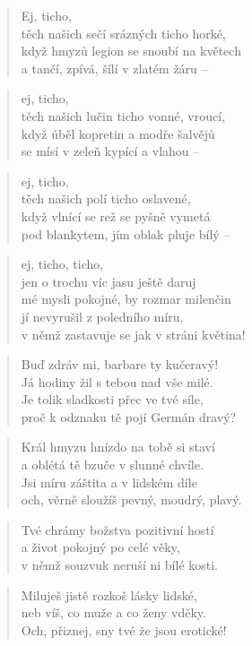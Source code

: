 \documentclass{book}
\begin{document}
\newpage
{}
\begin{verse}
Ej, ticho,\\
těch našich sečí srázných ticho horké,\\
když hmyzů legion se snoubí na květech\\
a tančí, zpívá, šílí v zlatém žáru --
\end{verse}
\begin{verse}
ej, ticho,\\
těch našich lučin ticho vonné, vroucí,\\
když úběl kopretin a modře šalvějů\\
se mísí v zeleň kypící a vlahou --
\end{verse}
\begin{verse}
ej, ticho,\\
těch našich polí ticho oslavené,\\
když vlnící se rež se pyšně vymetá\\
pod blankytem, jím oblak pluje bílý --
\end{verse}
\begin{verse}
ej, ticho, ticho,\\
jen o trochu víc jasu ještě daruj\\
mé mysli pokojné, by rozmar milenčin\\
jí nevyrušil z poledního míru,\\
v němž zastavuje se jak v stráni květina!
\end{verse}
\newpage
{}
\begin{verse}
Buď zdráv mi, barbare ty kučeravý!\\
Já hodiny žil s tebou nad vše milé.\\
Je tolik sladkosti přec ve tvé síle,\\
proč k odznaku tě pojí Germán dravý?
\end{verse}
\begin{verse}
Král hmyzu hnízdo na tobě si staví\\
a oblétá tě bzuče v slunné chvíle.\\
Jsi míru záštita a v lidském díle\\
och, věrně sloužíš pevný, moudrý, plavý.
\end{verse}
\begin{verse}
Tvé chrámy božstva pozitivní hostí\\
a život pokojný po celé věky,\\
v němž souzvuk neruší ni bílé kosti.
\end{verse}
\begin{verse}
Miluješ jistě rozkoš lásky lidské,\\
neb víš, co muže a co ženy vděky.\\
Och, přiznej, sny tvé že jsou erotické!
\end{verse}
\end{document}
